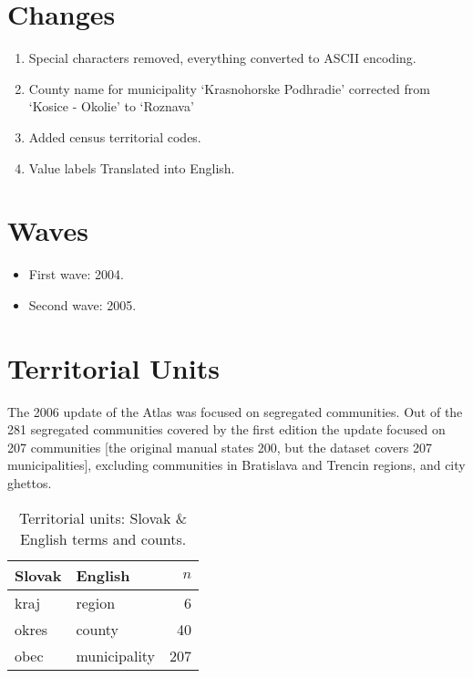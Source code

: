 \documentclass[11pt, a4paper]{article}
\begin{document}
\section{Changes}

\begin{enumerate}
	\item 	Special characters removed, everything converted to ASCII encoding.
	\item 	County name for municipality `Krasnohorske Podhradie' corrected from `Kosice - Okolie'
			to `Roznava'
	\item 	Added census territorial codes.	
	\item 	Value labels Translated into English.
\end{enumerate}



\section{Waves}

\begin{itemize}
	\item	First wave:  2004.
	\item	Second wave:  2005.
\end{itemize}


\section{Territorial Units}

The 2006 update of the Atlas was focused on segregated communities.  
Out of the 281 segregated communities covered by the first edition
the update focused on 207 communities [the original manual states 
200, but the dataset covers 207 municipalities], excluding communities 
in Bratislava and Trencin regions, and city ghettos. 


\begin{table}[H]
	\label{tab:territ}
	\caption{Territorial units: Slovak \& English terms and counts.}
	\begin{center}
		\begin{tabular}{l l r}
			\toprule
			Slovak & English & $n$ \\
			\midrule
			kraj	&	region 							&	6	\\
			okres	&	county 							&	40	\\
			obec 	&	municipality					&	207	\\
			\bottomrule
		\end{tabular}
	\end{center}
\end{table}
\end{document}
